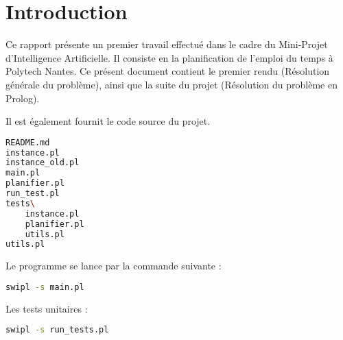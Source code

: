 \section{Introduction}

Ce rapport présente un premier travail effectué dans le cadre du Mini-Projet
d'Intelligence Artificielle.
Il consiste en la planification de l'emploi du temps à Polytech Nantes.
Ce présent document contient le premier rendu (Résolution générale du problème),
ainsi que la suite du projet (Résolution du problème en Prolog).

Il est également fournit le code source du projet.


\begin{lstlisting}[language=bash, caption=Fichiers, captionpos=b]
README.md
instance.pl
instance_old.pl
main.pl
planifier.pl
run_test.pl
tests\
    instance.pl
    planifier.pl
    utils.pl
utils.pl
\end{lstlisting}

Le programme se lance par la commande suivante :

\begin{lstlisting}[language=bash, caption=Lancer l'algorithme, captionpos=b]
swipl -s main.pl
\end{lstlisting}

Les tests unitaires :

\begin{lstlisting}[language=bash, caption=Lancer les tests, captionpos=b]
swipl -s run_tests.pl
\end{lstlisting}

